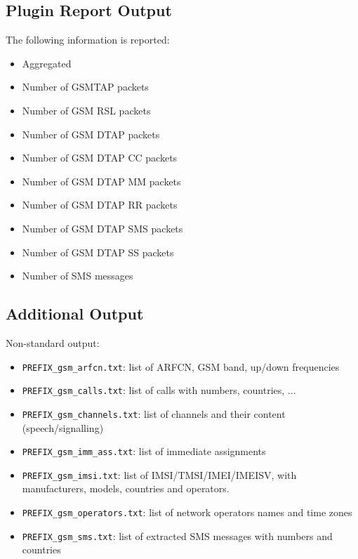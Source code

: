 \documentclass[documentation]{subfiles}
\begin{document}
\subsection{Plugin Report Output}
The following information is reported:
\begin{itemize}
    \item Aggregated {\tt{}}
    \item Number of GSMTAP packets
    \item Number of GSM RSL packets
    \item Number of GSM DTAP packets
    \item Number of GSM DTAP CC packets
    \item Number of GSM DTAP MM packets
    \item Number of GSM DTAP RR packets
    \item Number of GSM DTAP SMS packets
    \item Number of GSM DTAP SS packets
    \item Number of SMS messages
\end{itemize}

\subsection{Additional Output}
Non-standard output:
\begin{itemize}
    \item {\tt PREFIX\_gsm\_arfcn.txt}: list of ARFCN, GSM band, up/down frequencies
    \item {\tt PREFIX\_gsm\_calls.txt}: list of calls with numbers, countries, ...
    \item {\tt PREFIX\_gsm\_channels.txt}: list of channels and their content (speech/signalling)
    \item {\tt PREFIX\_gsm\_imm\_ass.txt}: list of immediate assignments
    \item {\tt PREFIX\_gsm\_imsi.txt}: list of IMSI/TMSI/IMEI/IMEISV, with manufacturers, models, countries and operators.
    \item {\tt PREFIX\_gsm\_operators.txt}: list of network operators names and time zones
    \item {\tt PREFIX\_gsm\_sms.txt}: list of extracted SMS messages with numbers and countries
\end{itemize}

\clearpage
\end{document}
